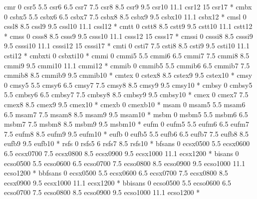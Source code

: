 \regtfm cmr 0 csr5 5.5 csr6 6.5 csr7 7.5 csr8 8.5 csr9 9.5
              csr10 11.1 csr12 15 csr17 *
\regtfm cmbx 0 csbx5 5.5 csbx6 6.5 csbx7 7.5 csbx8 8.5 csbx9 9.5 
              csbx10 11.1 csbx12 *
\regtfm cmsl 0 cssl8 8.5 cssl9 9.5 cssl10 11.1 cssl12 *
\regtfm cmtt 0 cstt8 8.5 cstt9 9.5 cstt10 11.1 cstt12 *
\regtfm cmss 0 csss8 8.5 csss9 9.5 csss10 11.1 csss12 15 csss17 *
\regtfm cmssi 0 csssi8 8.5 csssi9 9.5 csssi10 11.1 csssi12 15 csssi17 *
\regtfm cmti 0 csti7 7.5 csti8 8.5 csti9 9.5 csti10 11.1 csti12 *
\regtfm cmbxti 0 csbxti10 *
\regtfm cmmi 0 cmmi5 5.5 cmmi6 6.5 cmmi7 7.5 cmmi8 8.5 cmmi9 9.5
              cmmi10 11.1 cmmi12 *
\regtfm cmmib 0 cmmib5 5.5 cmmib6 6.5 cmmib7 7.5 cmmib8 8.5 cmmib9
             9.5 cmmib10 *
\regtfm cmtex 0 cstex8 8.5 cstex9 9.5 cstex10 *
\regtfm cmsy 0 cmsy5 5.5 cmsy6 6.5 cmsy7 7.5 cmsy8 8.5 cmsy9 9.5
              cmsy10 *
\regtfm cmbsy 0 cmbsy5 5.5 cmbsy6 6.5 cmbsy7 7.5 cmbsy8 8.5 cmbsy9 9.5
              cmbsy10 *  
\regtfm cmex 0 cmex7 7.5 cmex8 8.5 cmex9 9.5 cmex10 *
\regtfm cmexb 0 cmexb10 *
\regtfm msam 0 msam5 5.5 msam6 6.5 msam7 7.5 msam8 8.5 msam9
             9.5 msam10 *
\regtfm msbm 0 msbm5 5.5 msbm6 6.5 msbm7 7.5 msbm8 8.5 msbm9 
             9.5 msbm10 *
\regtfm eufm 0 eufm5 5.5 eufm6 6.5 eufm7 7.5 eufm8 8.5 eufm9 
             9.5 eufm10 *
\regtfm eufb 0 eufb5 5.5 eufb6 6.5 eufb7 7.5 eufb8 8.5 eufb9 
             9.5 eufb10 *
\regtfm rsfs 0 rsfs5 6 rsfs7 8.5 rsfs10 *
\regtfm bfsans 0 ecsx0500 5.5 ecsx0600 6.5 ecsx0700 7.5 ecsx0800 
             8.5 ecsx0900 9.5 ecsx1000 11.1 ecsx1200 * 
\regtfm bisans 0 ecso0500 5.5 ecso0600 6.5 ecso0700 7.5 ecso0800 
             8.5 ecso0900 9.5 ecso1000 11.1 ecso1200 * 
\regtfm bbfsans 0 ecsx0500 5.5 ecsx0600 6.5 ecsx0700 7.5 ecsx0800 
             8.5 ecsx0900 9.5 ecsx1000 11.1 ecsx1200 * 
\regtfm bbisans 0 ecso0500 5.5 ecso0600 6.5 ecso0700 7.5 ecso0800 
             8.5 ecso0900 9.5 ecso1000 11.1 ecso1200 * 

\fi



